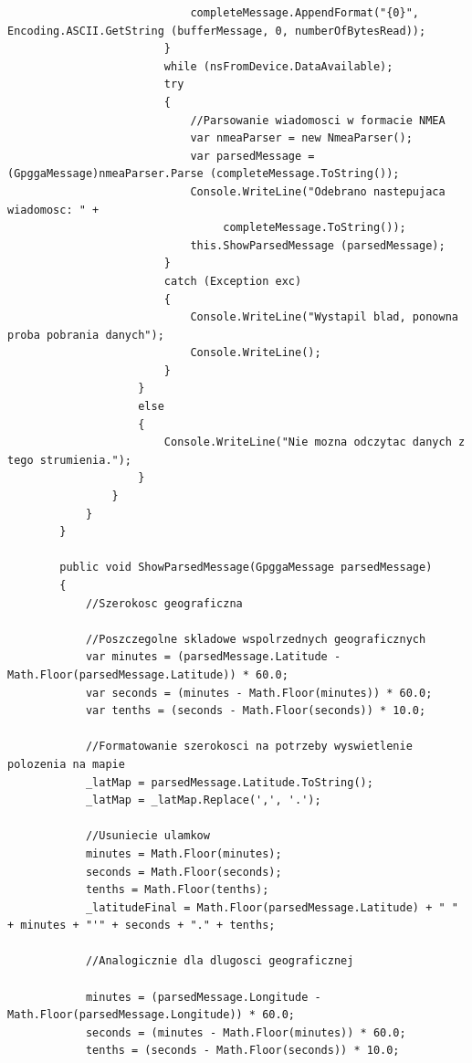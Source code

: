 \documentclass[12pt,a4paper,notitlepage]{report}
\begin{document}
\begin{adjustwidth}{0pt}{-50pt}
\begin{lstlisting}
                            completeMessage.AppendFormat("{0}", Encoding.ASCII.GetString (bufferMessage, 0, numberOfBytesRead));
                        }
                        while (nsFromDevice.DataAvailable);
                        try
                        {
                            //Parsowanie wiadomosci w formacie NMEA
                            var nmeaParser = new NmeaParser();
                            var parsedMessage = (GpggaMessage)nmeaParser.Parse (completeMessage.ToString());
                            Console.WriteLine("Odebrano nastepujaca wiadomosc: " +
                                 completeMessage.ToString());
                            this.ShowParsedMessage (parsedMessage);
                        }
                        catch (Exception exc)
                        {
                            Console.WriteLine("Wystapil blad, ponowna proba pobrania danych");
                            Console.WriteLine();
                        }
                    }
                    else
                    {
                        Console.WriteLine("Nie mozna odczytac danych z tego strumienia.");
                    }
                }
            }
        }

        public void ShowParsedMessage(GpggaMessage parsedMessage)
        {
            //Szerokosc geograficzna

            //Poszczegolne skladowe wspolrzednych geograficznych
            var minutes = (parsedMessage.Latitude - Math.Floor(parsedMessage.Latitude)) * 60.0;
            var seconds = (minutes - Math.Floor(minutes)) * 60.0;
            var tenths = (seconds - Math.Floor(seconds)) * 10.0;

            //Formatowanie szerokosci na potrzeby wyswietlenie polozenia na mapie
            _latMap = parsedMessage.Latitude.ToString();
            _latMap = _latMap.Replace(',', '.');

            //Usuniecie ulamkow
            minutes = Math.Floor(minutes);
            seconds = Math.Floor(seconds);
            tenths = Math.Floor(tenths);
            _latitudeFinal = Math.Floor(parsedMessage.Latitude) + " " + minutes + "'" + seconds + "." + tenths;

            //Analogicznie dla dlugosci geograficznej

            minutes = (parsedMessage.Longitude - Math.Floor(parsedMessage.Longitude)) * 60.0;
            seconds = (minutes - Math.Floor(minutes)) * 60.0;
            tenths = (seconds - Math.Floor(seconds)) * 10.0;


\end{lstlisting}
\end{adjustwidth}
\end{document}

